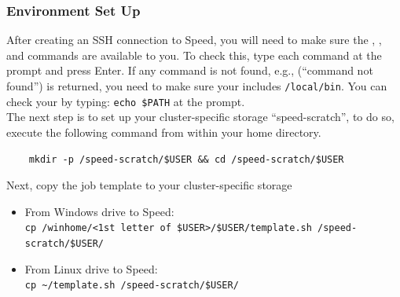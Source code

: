 \subsubsection{Environment Set Up}
\label{sect:envsetup}

After creating an SSH connection to Speed, you will need to make sure the 
, , and  commands are available to you. 
To check this, type each command at the prompt and press Enter.
If any command is not found, e.g., (``command not found'') is returned,
you need to make sure your  includes \texttt{/local/bin}.
You can check your  by typing:
\texttt{echo \$PATH} at the prompt.\\
%
%
%
%
%
%

\noindent The next step is to set up your cluster-specific storage ``speed-scratch'', to do so, execute the following command from within your
home directory. 
\begin{verbatim}
    mkdir -p /speed-scratch/$USER && cd /speed-scratch/$USER
\end{verbatim}

\noindent Next, copy the job template to your cluster-specific storage
\begin{itemize}
    \item From Windows drive to Speed:\\ 
    \verb|cp /winhome/<1st letter of $USER>/$USER/template.sh /speed-scratch/$USER/|
    \item From Linux drive to Speed:\\
    \verb|cp ~/template.sh /speed-scratch/$USER/|
\end{itemize}

